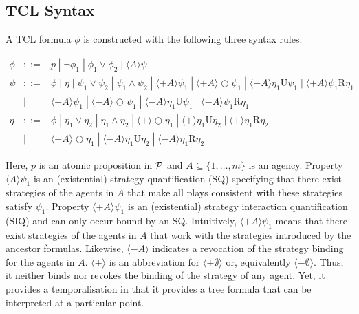 \documentclass{llncs}
\newcommand{\calp}{{\cal P}}
\newcommand{\until}{\textrm{U}} %
\newcommand{\rmrel}{\textrm{R}} %
\newcommand{\nxt}{\bigcirc}
\begin{document}
\subsection{TCL Syntax \label{subsec.bsil.syntax}}


A TCL formula $\phi$ is constructed with the following three syntax rules.
\smallskip

\noindent
$\begin{array}{rcl}
\phi    & ::= & p\;|\; \neg\phi_1 \;|\; \phi_1\vee \phi_2
    \;|\; \langle  A\rangle \psi
    \\
\psi  & ::= & \phi \;|\; \eta \;|\; \psi_1\vee \psi_2\;|\; \psi_1\wedge \psi_2
    \;|\; \langle+A\rangle \psi_1
    \;|\; \langle+A\rangle\nxt\psi_1 
    \;|\; \langle+A\rangle\eta_1\until \psi_1
    \;|\; \langle+A\rangle\psi_1\rmrel \eta_1 \\
    & | & \langle-A\rangle \psi_1
    \;|\; \langle-A\rangle\nxt\psi_1 
    \;|\; \langle-A\rangle\eta_1\until \psi_1
    \;|\; \langle-A\rangle\psi_1\rmrel \eta_1 
    \\
\eta  & ::= & \phi \;|\; \eta_1\vee \eta_2\;|\; \eta_1\wedge \eta_2
    \;|\; \langle+\rangle\nxt\eta_1 
    \;|\; \langle+\rangle\eta_1\until \eta_2
    \;|\; \langle+\rangle\eta_1\rmrel \eta_2 \\
    & | & \langle-A\rangle\nxt\eta_1 
    \;|\; \langle-A\rangle\eta_1\until \eta_2
    \;|\; \langle-A\rangle\eta_1\rmrel \eta_2 
\end{array}$
\smallskip

Here, $p$ is an atomic proposition in $\calp$ and $A\subseteq \{1,\ldots,m\}$ is an agency.  
Property $\langle A\rangle\psi_1$ is an (existential) 
strategy quantification (SQ) specifying that
there exist strategies of the agents in $A$
that make all plays consistent with these strategies satisfy $\psi_1$.
Property $\langle+A\rangle\psi_1$ is an (existential) 
strategy interaction quantification (SIQ) and 
can only occur bound by an SQ.
Intuitively, $\langle+A\rangle\psi_1$ means that there exist strategies of the agents in $A$
that work with the strategies introduced by the ancestor formulas.
Likewise, $\langle -A \rangle$ indicates a revocation of the strategy binding for the agents in $A$.
$\langle + \rangle$ is an abbreviation for $\langle + \emptyset\rangle$ or, equivalently $\langle - \emptyset \rangle$.
Thus, it neither binds nor revokes the binding of the strategy of any agent.
Yet, it provides a temporalisation in that it provides a tree formula that can be interpreted at a particular point.
\end{document}
